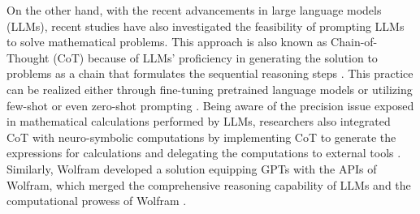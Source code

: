 On the other hand, with the recent advancements in large language models (LLMs), recent studies have also investigated the feasibility of prompting LLMs to solve mathematical problems. 
This approach is also known as Chain-of-Thought (CoT) because of LLMs' proficiency in generating the solution to problems as a chain that formulates the sequential reasoning steps \cite{palm,cot}.
This practice can be realized either through fine-tuning pretrained language models or utilizing few-shot or even zero-shot prompting \cite{zs1,zs2,zsr}.
% 
Being aware of the precision issue exposed in mathematical calculations performed by LLMs, researchers also integrated CoT with neuro-symbolic computations by implementing CoT to generate the expressions for calculations and delegating the computations to external tools \cite{gsm8k}.
Similarly, Wolfram developed a solution equipping GPTs with the APIs of Wolfram, which merged the comprehensive reasoning capability of LLMs and the computational prowess of Wolfram \cite{wolfram}.
